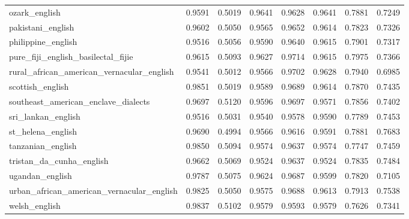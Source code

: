 \begin{landscape}
\begin{longtable}{lccccccc}
ozark\_english & 0.9591 & 0.5019 & 0.9641 & 0.9628 & 0.9641 & 0.7881 & 0.7249 \\
pakistani\_english & 0.9602 & 0.5050 & 0.9565 & 0.9652 & 0.9614 & 0.7823 & 0.7326 \\
philippine\_english & 0.9516 & 0.5056 & 0.9590 & 0.9640 & 0.9615 & 0.7901 & 0.7317 \\
pure\_fiji\_english\_basilectal\_fijie & 0.9615 & 0.5093 & 0.9627 & 0.9714 & 0.9615 & 0.7975 & 0.7366 \\
rural\_african\_american\_vernacular\_english & 0.9541 & 0.5012 & 0.9566 & 0.9702 & 0.9628 & 0.7940 & 0.6985 \\
scottish\_english & 0.9851 & 0.5019 & 0.9589 & 0.9689 & 0.9614 & 0.7870 & 0.7435 \\
southeast\_american\_enclave\_dialects & 0.9697 & 0.5120 & 0.9596 & 0.9697 & 0.9571 & 0.7856 & 0.7402 \\
sri\_lankan\_english & 0.9516 & 0.5031 & 0.9540 & 0.9578 & 0.9590 & 0.7789 & 0.7453 \\
st\_helena\_english & 0.9690 & 0.4994 & 0.9566 & 0.9616 & 0.9591 & 0.7881 & 0.7683 \\
tanzanian\_english & 0.9850 & 0.5094 & 0.9574 & 0.9637 & 0.9574 & 0.7747 & 0.7459 \\
tristan\_da\_cunha\_english & 0.9662 & 0.5069 & 0.9524 & 0.9637 & 0.9524 & 0.7835 & 0.7484 \\
ugandan\_english & 0.9787 & 0.5075 & 0.9624 & 0.9687 & 0.9599 & 0.7820 & 0.7105 \\
urban\_african\_american\_vernacular\_english & 0.9825 & 0.5050 & 0.9575 & 0.9688 & 0.9613 & 0.7913 & 0.7538 \\
welsh\_english & 0.9837 & 0.5102 & 0.9579 & 0.9593 & 0.9579 & 0.7626 & 0.7341 \\
\bottomrule
\end{longtable}
\end{landscape}